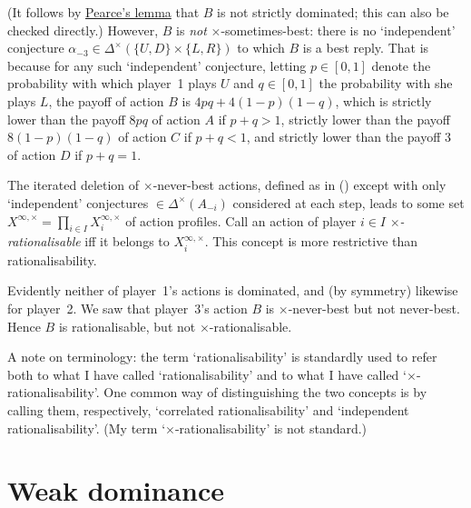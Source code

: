 \begin{example}
	(It follows by \hyperref[lemma:pearce]{Pearce's lemma} that $B$ is not strictly dominated; this can also be checked directly.)
	However, $B$ is \emph{not} $\times$-sometimes-best: there is no `independent' conjecture $\alpha_{-3} \in \Delta^\times (\{U,D\} \times \{L,R\})$ to which $B$ is a best reply. That is because for any such `independent' conjecture, letting $p \in [0,1]$ denote the probability with which player~1 plays $U$ and $q \in [0,1]$ the probability with she plays $L$,
	the payoff of action $B$ is $4pq + 4(1-p)(1-q)$, which is
	strictly lower than the payoff $8pq$ of action $A$ if $p+q>1$,
	strictly lower than the payoff $8(1-p)(1-q)$ of action $C$ if $p+q<1$,
	and strictly lower than the payoff $3$ of action $D$ if $p+q=1$.
\end{example}

The iterated deletion of $\times$-never-best actions, defined as in  () except with only `independent' conjectures $\in \Delta^\times(A_{-i})$ considered at each step, leads to some set $X^{\infty,\times} = \prod_{i \in I} X^{\infty,\times}_i$ of action profiles. Call an action of player $i \in I$ \emph{$\times$-rationalisable} iff it belongs to $X^{\infty,\times}_i$. This concept is more restrictive than rationalisability.

\addtocounter{example}{-1}
\begin{example}[continued]
	\label{example:rbty_indep_contd}
	Evidently neither of player~1's actions is dominated, and (by symmetry) likewise for player~2. We saw that player~3's action $B$ is $\times$-never-best but not never-best. Hence $B$ is rationalisable, but not $\times$-rationalisable.
\end{example}

A note on terminology: the term `rationalisability' is standardly used to refer both to what I have called `rationalisability' and to what I have called `$\times$-rationalisability'. One common way of distinguishing the two concepts is by calling them, respectively, `correlated rationalisability' and `independent rationalisability'. (My term `$\times$-rationalisability' is not standard.)



\section{Weak dominance}
\label{dom:weak_dom}

